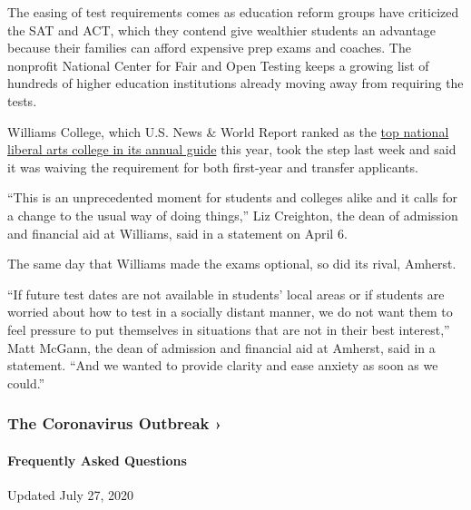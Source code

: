 The easing of test requirements comes as education reform groups have
criticized the SAT and ACT, which they contend give wealthier students
an advantage because their families can afford expensive prep exams and
coaches. The nonprofit National Center for Fair and Open Testing keeps a
growing list of hundreds of higher education institutions already moving
away from requiring the tests.

Williams College, which U.S. News \& World Report ranked as the
\href{https://www.usnews.com/best-colleges/williams-college-2229}{top
national liberal arts college in its annual guide} this year, took the
step last week and said it was waiving the requirement for both
first-year and transfer applicants.

``This is an unprecedented moment for students and colleges alike and it
calls for a change to the usual way of doing things,'' Liz Creighton,
the dean of admission and financial aid at Williams, said in a statement
on April 6.

The same day that Williams made the exams optional, so did its rival,
Amherst.

``If future test dates are not available in students' local areas or if
students are worried about how to test in a socially distant manner, we
do not want them to feel pressure to put themselves in situations that
are not in their best interest,'' Matt McGann, the dean of admission and
financial aid at Amherst, said in a statement. ``And we wanted to
provide clarity and ease anxiety as soon as we could.''

\href{https://www.nytimes.com/news-event/coronavirus?action=click\&pgtype=Article\&state=default\&region=MAIN_CONTENT_3\&context=storylines_faq}{}

\hypertarget{the-coronavirus-outbreak-}{%
\subsubsection{The Coronavirus Outbreak
›}\label{the-coronavirus-outbreak-}}

\hypertarget{frequently-asked-questions}{%
\paragraph{Frequently Asked
Questions}\label{frequently-asked-questions}}

Updated July 27, 2020

